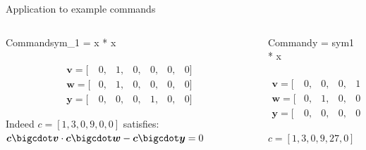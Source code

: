 \documentclass[handout]{beamer}
\begin{document}
\begin{frame}{Application to example commands}   
    \begin{columns}[T] %
    \begin{column}{.48\textwidth}
        \begin{block}{Command}sym_1 = x * x\end{block} \pause
        
        \begin{align*}        
             [ &one,&x,&out,&sym_1,&y,&sym_2 ]\\
             \bm{v} = [&0,&1,&0,&0,&0,&0]  \\
             \bm{w} = [&0,&1,&0,&0,&0,&0]  \\
             \bm{y} = [&0,&0,&0,&1,&0,&0] 
        \end{align*}
        
        Indeed $c = [1,3,0,9,0,0]$ satisfies: $\bm{c} \bigcdot \bm{v} \cdot \bm{c} \bigcdot \bm{w} - \bm{c} \bigcdot \bm{y} = 0$   
    \end{column}%
    \hfill%
    \begin{column}{.48\textwidth}
        \begin{block}{Command}y = sym1 * x\end{block} \pause
        
        \begin{align*}        
              [ &one,&x,&out,&sym_1,&y,&sym_2 ]\\
             \bm{v} = [&0,&0,&0,&1,&0,&0]  \\
             \bm{w} = [&0,&1,&0,&0,&0,&0]  \\
             \bm{y} = [&0,&0,&0,&0,&1,&0] 
        \end{align*}    

        $c = [1,3,0,9,27,0]$
\end{column}%
\end{columns} 
\end{frame}
\end{document}
